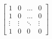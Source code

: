 \documentclass{article}
\begin{document}
\begin{equation}
	\begin{bmatrix}
		1 & 0 & \dots & 0 \\
		1 & 0 & \dots & 0 \\
		\vdots & \vdots & \ddots & \vdots \\
		1 & 0 & 0 & 0
		
	\end{bmatrix}
\end{equation}
		
\end{document}
